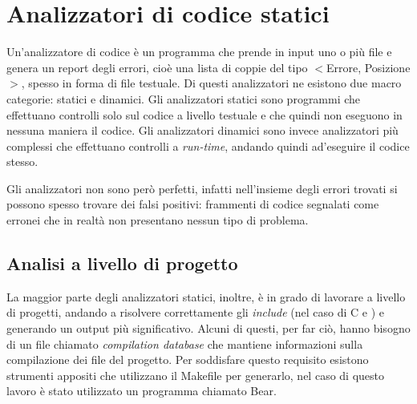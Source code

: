 


\section{Analizzatori di codice statici}
Un'analizzatore di codice è un programma che prende in input uno o più file e genera un report degli errori, cioè una lista di coppie del tipo $<$Errore, Posizione$>$, spesso in forma di file testuale. Di questi analizzatori ne esistono due macro categorie: statici e dinamici. 
Gli analizzatori statici sono programmi che effettuano controlli solo sul codice a livello testuale e che quindi non eseguono in nessuna maniera il codice. Gli analizzatori dinamici sono invece analizzatori più complessi che effettuano controlli a \textit{run-time},
andando quindi ad'eseguire il codice stesso.

Gli analizzatori non sono però perfetti, infatti nell'insieme degli errori trovati si possono spesso trovare dei falsi positivi: frammenti di codice segnalati come erronei che in realtà non presentano nessun tipo di problema.


\subsection{Analisi a livello di progetto} \label{subsec:compile_database}
La maggior parte degli analizzatori statici, inoltre, è in grado di lavorare a livello di progetti, andando a risolvere correttamente gli \textit{include} (nel caso di C e \CPP) e generando un output più significativo. 
Alcuni di questi, per far ciò, hanno bisogno di un file chiamato \textit{compilation database} che mantiene informazioni sulla compilazione dei file del progetto. 
Per soddisfare questo requisito esistono strumenti appositi che utilizzano il Makefile per generarlo, nel caso di questo lavoro è stato utilizzato un programma chiamato Bear.


